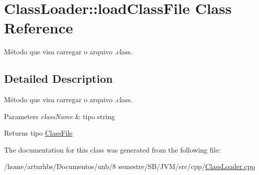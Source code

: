 \hypertarget{classClassLoader_1_1loadClassFile}{}\section{Class\+Loader\+:\+:load\+Class\+File Class Reference}
\label{classClassLoader_1_1loadClassFile}


Método que visa carregar o arquivo .class.  




\subsection{Detailed Description}
Método que visa carregar o arquivo .class. 


\begin{DoxyParams}{Parameters}
{\em class\+Name} & tipo string \\
\hline
\end{DoxyParams}
\begin{DoxyReturn}{Returns}
tipo \hyperlink{classClassFile}{Class\+File} 
\end{DoxyReturn}


The documentation for this class was generated from the following file\+:\begin{DoxyCompactItemize}
\item 
/home/arturhbs/\+Documentos/unb/8 semestre/\+S\+B/\+J\+V\+M/src/cpp/\hyperlink{ClassLoader_8cpp}{Class\+Loader.\+cpp}\end{DoxyCompactItemize}
